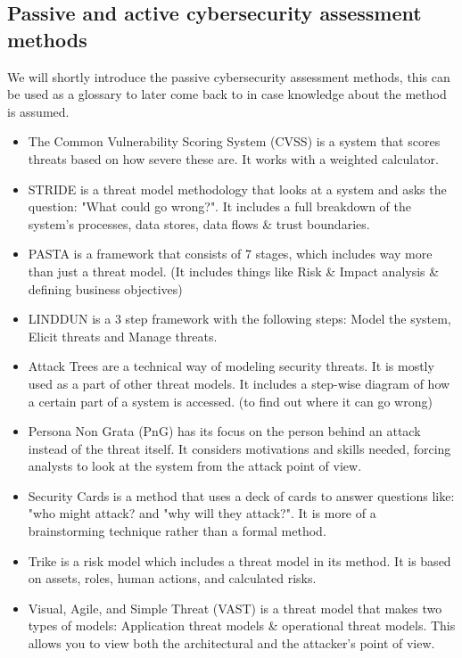 \subsection{Passive and active cybersecurity assessment methods}
 We will shortly introduce the passive cybersecurity assessment methods, this can be used as a glossary to later come back to in case knowledge about the method is assumed.
 \begin{itemize}	
	\item The Common Vulnerability Scoring System (CVSS) is a system that scores threats based on how severe these are. It works with a weighted calculator.\citep{CVSS}
	\item STRIDE is a threat model methodology that looks at a system and asks the question: "What could go wrong?". It includes a full breakdown of the system’s processes, data stores, data flows \& trust boundaries.\citep{Whati4967383:online}
	\item PASTA is a framework that consists of 7 stages, which includes way more than just a threat model. (It includes things like Risk \& Impact analysis \& defining business objectives)\citep{WHATI1132766:online}
	\item LINDDUN is a 3 step framework with the following steps: Model the system, Elicit threats and Manage threats.\citep{LINDD5512475:online}
	\item Attack Trees are a technical way of modeling security threats. It is mostly used as a part of other threat models. It includes a step-wise diagram of how a certain part of a system is accessed. (to find out where it can go wrong)\citep{Acade2182618:online}
	\item Persona Non Grata (PnG) has its focus on the person behind an attack instead of the threat itself. It considers motivations and skills needed, forcing analysts to look at the system from the attack point of view.\citep{MeadAHybrid2018}
	\item Security Cards is a method that uses a deck of cards to answer questions like: "who might attack? and "why will they attack?". It is more of a brainstorming technique rather than a formal method. \citep{MeadAHybrid2018}
	\item Trike is a risk model which includes a threat model in its method. It is based on assets, roles, human actions, and calculated risks. \citep{Trike7987253:online}
	\item Visual, Agile, and Simple Threat (VAST) is a threat model that makes two types of models: Application threat models \& operational threat models. This allows you to view both the architectural and the attacker's point of view.\citep{Secur7871605:online}
\end{itemize}

